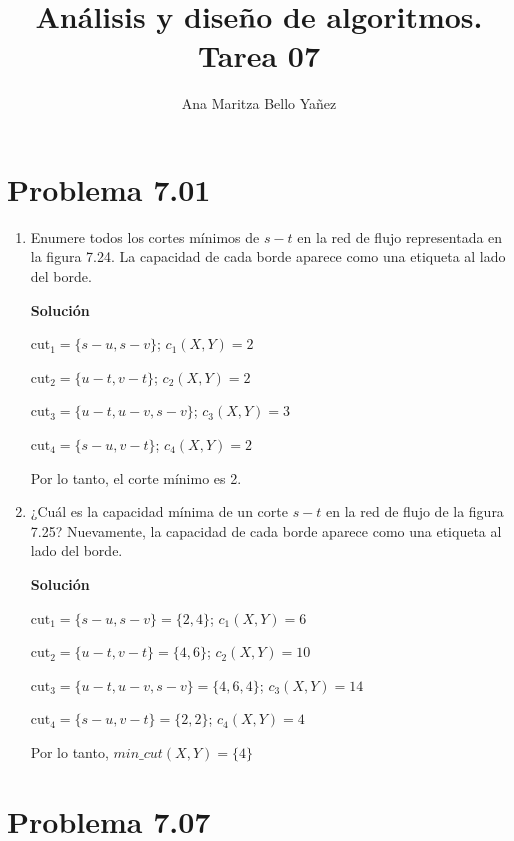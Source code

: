 \documentclass{article}
\begin{document}
\title{Análisis y diseño de algoritmos. \\ Tarea 07}
\author{Ana Maritza Bello Yañez}
\maketitle
\setlength{\parindent}{0pt}
\setlength{\parskip}{1em}

\section*{Problema 7.01}

\begin{enumerate}

\item Enumere todos los cortes mínimos de $s-t$ en la red de flujo representada en
la figura 7.24. La capacidad de cada borde aparece como una etiqueta al lado del
borde.

\textbf{Solución}


$\text{cut}_1 = \{s-u, s-v\}$;     $c_1(X,Y) = 2$


$\text{cut}_2 = \{u-t,v-t\}$;      $c_2(X,Y) = 2$


$\text{cut}_3 = \{ u-t, u-v, s-v \}$;  $c_3(X,Y) = 3$


$\text{cut}_4 = \{ s-u, v-t\}$;    $c_4(X,Y) = 2$

Por lo tanto, el corte mínimo es 2.

\item ¿Cuál es la capacidad mínima de un corte $s-t$ en la red de flujo de la
figura 7.25? Nuevamente, la capacidad de cada borde aparece como una etiqueta al
lado del borde.

\textbf{Solución}


$\text{cut}_1 = \{s-u, s-v\} = \{2,4\}$;     $c_1(X,Y) = 6$


$\text{cut}_2 = \{u-t,v-t\} = \{4,6\}$;      $c_2(X,Y) = 10$


$\text{cut}_3 = \{ u-t, u-v, s-v \} = \{4,6,4\}$;  $c_3(X,Y) = 14$


$\text{cut}_4 = \{ s-u, v-t\} = \{2,2\}$;    $c_4(X,Y) = 4$

Por lo tanto, $min\_cut(X,Y) = \{4\}$

\end{enumerate}    

\section*{Problema 7.07}
\end{document}
